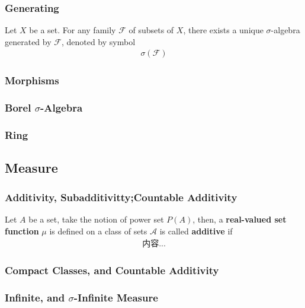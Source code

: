 \documentclass[Total.tex]{subfiles}
\begin{document}
				\subsubsection{Generating}
					\begin{Def}
						Let $X$ be a set. For any family $\mathcal{F}$ of subsets of $X$, there exists a unique $\sigma$-algebra generated by $\mathcal{F}$, denoted by symbol
						\begin{gather*}
							\sigma(\mathcal{F})
						\end{gather*}
					\end{Def}
					\begin{proposition}
						
					\end{proposition}
				\subsubsection{Morphisms}
				\subsubsection{Borel $\sigma$-Algebra}
				\subsubsection{Ring}
				
			\subsection{Measure}
			\subsubsection{Additivity, Subadditivitty;Countable Additivity}
			\begin{Def}
				Let $A$ be a set, take the notion of power set $P(A)$, then, a \textbf{real-valued set function} $\mu$ is defined on a class of sets $\mathcal{A}$ is called \textbf{additive} if
				\begin{gather*}
					内容...
				\end{gather*} 
			\end{Def}
			\subsubsection{Compact Classes, and Countable Additivity}
			\subsubsection{Infinite, and $\sigma$-Infinite Measure}
\end{document}

